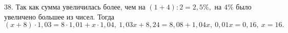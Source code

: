 38. Так как сумма увеличилась более, чем на $(1+4):2=2,5\%,$ на $4\%$ было увеличено большее из чисел. Тогда $(x+8)\cdot1,03=8\cdot1,01+x\cdot1,04,\
1,03x+8,24=8,08+1,04x,\ 0,01x=0,16,\ x=16.$\\
